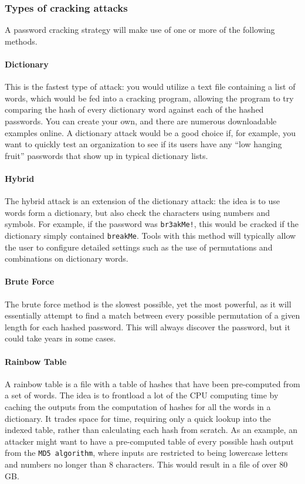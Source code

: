 \subsubsection{Types of cracking attacks}
A password cracking strategy will make use of one or more of the following methods.

\paragraph{Dictionary}
This is the fastest type of attack: you would utilize a text file containing a list of words, which would be fed into a cracking program, allowing the program to try comparing the hash of every dictionary word against each of the hashed passwords. You can create your own, and there are numerous downloadable examples online. A dictionary attack would be a good choice if, for example, you want to quickly test an organization to see if its users have any ``low hanging fruit'' passwords that show up in typical dictionary lists.

\paragraph{Hybrid}
The hybrid attack is an extension of the dictionary attack: the idea is to use words form a dictionary, but also check the characters using numbers and symbols. For example, if the password was \verb|br3akMe!|, this would be cracked if the dictionary simply contained \verb|breakMe|. Tools with this method will typically allow the user to configure detailed settings such as the use of permutations and combinations on dictionary words.

\paragraph{Brute Force}
The brute force method is the slowest possible, yet the most powerful, as it will essentially attempt to find a match between every possible permutation of a given length for each hashed password. This will always discover the password, but it could take years in some cases.

\paragraph{Rainbow Table}
A rainbow table is a file with a table of hashes that have been pre-computed from a set of words. The idea is to frontload a lot of the CPU computing time by caching the outputs from the computation of hashes for all the words in a dictionary. It trades space for time, requiring only a quick lookup into the indexed table, rather than calculating each hash from scratch. As an example, an attacker might want to have a pre-computed table of every possible hash output from the \verb|MD5 algorithm|, where inputs are restricted to being lowercase letters and numbers no longer than 8 characters. This would result in a file of over 80 GB.

